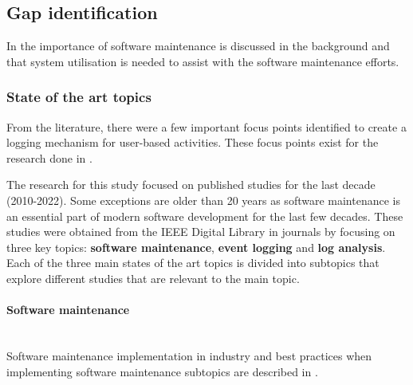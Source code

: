 \clearpage

\subsection{Gap identification}
In  the importance of software maintenance is discussed in the background and that system utilisation is needed to assist with the software maintenance efforts.

\subsubsection{State of the art topics}
From the literature, there were a few important focus points identified to create a logging mechanism for user-based activities. These focus points exist for the research done in .\par The research for this study focused on published studies for the last decade (2010-2022). Some exceptions are older than 20 years as software maintenance is an essential part of modern software development for the last few decades. These studies were obtained from the IEEE Digital Library in journals by focusing on three key topics: \textbf{software maintenance}, \textbf{event logging} and \textbf{log analysis}. Each of the three main states of the art topics is divided into subtopics that explore different studies that are relevant to the main topic.

\paragraph{Software maintenance} \leavevmode\\
Software maintenance implementation in industry and best practices when implementing software maintenance subtopics are described in .

